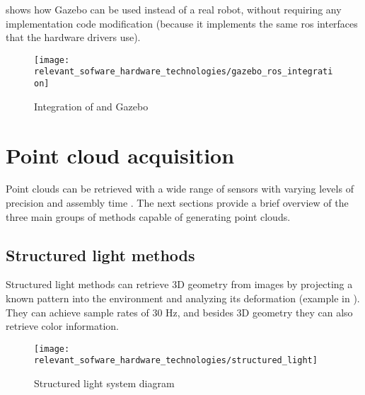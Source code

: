  shows how Gazebo can be used instead of a real robot, without requiring any implementation code modification (because it implements the same \gls{ros} interfaces that the hardware drivers use).

\begin{figure}[ht]
	\centering
	\texttt{[image: relevant\_sofware\_hardware\_technologies/gazebo\_ros\_integration]}
	\caption[Integration of  and Gazebo]{Integration of  and Gazebo\protect\footnotemark}
	\label{fig:relevant-sofware-hardware-technologies_gazebo-ros-integration}
\end{figure}

\clearpage



\section{Point cloud acquisition}

Point clouds can be retrieved with a wide range of sensors with varying levels of precision and assembly time \cite{Sansoni2009}. The next sections provide a brief overview of the three main groups of methods capable of generating point clouds.


\subsection{Structured light methods}

Structured light methods can retrieve 3D geometry from images by projecting a known pattern into the environment and analyzing its deformation (example in ). They can achieve sample rates of 30 Hz, and besides 3D geometry they can also retrieve color information.

\begin{figure}[H]
	\centering
	\texttt{[image: relevant\_sofware\_hardware\_technologies/structured\_light]}
	\caption[Structured light system diagram]{Structured light system diagram\protect\footnotemark}
	\label{fig:relevant-sofware-hardware-technologies_structured-light}
\end{figure}


